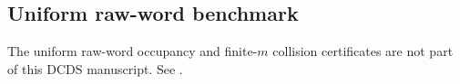 \subsection{Uniform raw-word benchmark}\label{app:uniform-collision}

The uniform raw-word occupancy and finite-$m$ collision certificates are not
part of this DCDS manuscript. See \cite[Proposition~7.5 and Corollaries~7.6--7.7]{MaZhang2026Nonlinearity}.
